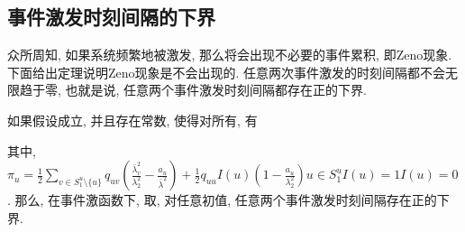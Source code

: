 \subsection{事件激发时刻间隔的下界}
        众所周知, 如果系统频繁地被激发, 那么将会出现不必要的事件累积, 即Zeno现象. 下面给出定理说明Zeno现象是不会出现的. 任意两次事件激发的时刻间隔都不会无限趋于零, 也就是说, 任意两个事件激发时刻间隔都存在正的下界.
        \begin{thm}\label{them2}
        如果假设成立, 并且存在常数, 使得对所有, 有
            \begin{comment}\label{thm:2}
            \left\{
            \begin{commented}
            &\pi+a+\pi_u-c\gamma(\lambda_2+\rho\beta)\leq0,\\
            &2a\lambda_2^2-\bar{\lambda}\alpha_2>0,\\
            &L^2_v-a_uI_N\leq 0, \quad\quad \text{if} \quad v\neq u, v\in S_2^u, \\
            &L^2_v-a_uI_N\geq 0, \quad\quad \text{if} \quad v= u, v\in S_2^u,
            \end{commented}
            \right.
            \end{comment}
        其中, $\pi_u=\frac{1}{2}\sum_{v\in S_1^u\setminus\{u\}}q_{uv}(\frac{\bar{\lambda}^2_{v}}{\lambda_2^2}-\frac{a_u}{\bar{\lambda}^2})
        +\frac{1}{2}q_{uu}I(u)(1-\frac{a_u}{\lambda_2^2})u\in S_1^uI(u)=1I(u)=0$.
        那么, 在事件激函数下, 取, 对任意初值, 任意两个事件激发时刻间隔存在正的下界.
        \end{thm}

